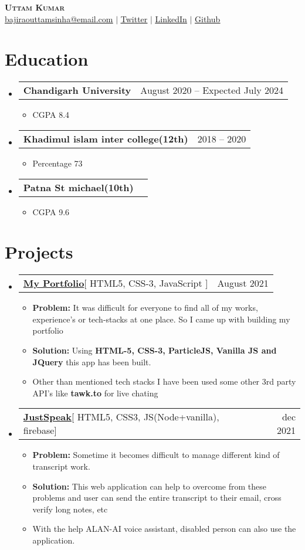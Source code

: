 \documentclass[letterpaper,11pt]{article}
\makeatletter
\newcommand{\resumeItem}[1]{
  \item\small{
    {#1 \vspace{-2pt}}
  }
}
\newcommand{\resumeProjectHeading}[2]{
    \item
    \begin{tabular*}{0.97\textwidth}{l@{\extracolsep{\fill}}r}
      \small#1 & #2 \\
    \end{tabular*}\vspace{-7pt}
}
\newcommand{\resumeSubHeadingListStart}{\begin{itemize}[leftmargin=0.15in, label={}]}
\newcommand{\resumeSubHeadingListEnd}{\end{itemize}}
\newcommand{\resumeItemListStart}{\begin{itemize}}
\newcommand{\resumeItemListEnd}{\end{itemize}\vspace{-5pt}}
\makeatother
\begin{document}

\begin{center}
    \textbf{\Huge \scshape Uttam Kumar} \\ \vspace{1pt}
    \href{mailto:youremailaddress}{\underline{bajiraouttamsinha@email.com}} $|$ 
    \href{https://twitter.com/Uttamku74410059}{\underline{Twitter}} $|$ 
    \href{https://linkedin.com/in/uttam-kumar-511a411ba}{\underline{LinkedIn}} $|$
    \href{https://github.com/helper-uttam}{\underline{Github}}
    
\end{center}

\section{Education}
  \resumeSubHeadingListStart
      \resumeProjectHeading
          {\textbf{Chandigarh University}}{August 2020 – Expected July 2024}
          \resumeItemListStart
           \resumeItem{CGPA 8.4}
        \resumeItemListEnd
        \resumeProjectHeading
          {\textbf{Khadimul islam inter college(12th)
}}{2018 -- 2020}
          \resumeItemListStart
           \resumeItem{Percentage 73}
        \resumeItemListEnd
        \resumeProjectHeading
          {\textbf{Patna St michael(10th)
}}{}
          \resumeItemListStart
           \resumeItem{CGPA 9.6}
        \resumeItemListEnd
    \resumeSubHeadingListEnd
    
\section{Projects}
    \resumeSubHeadingListStart
      \resumeProjectHeading
          {\textbf{\href{http://pubgofficial.me/portfolio/}{My Portfolio}}{[ HTML5, CSS-3, JavaScript ]}}{August 2021}
          \resumeItemListStart
           \resumeItem{\textbf{Problem:} It was difficult for everyone to find all of my works, experience's or tech-stacks at one place. So I came up with building my portfolio}
           \resumeItem{\textbf{Solution:} Using \textbf{HTML-5, CSS-3, ParticleJS, Vanilla JS and JQuery} this app has been built.}
           \resumeItem{Other than mentioned tech stacks I have been used some other 3rd party API's like \textbf{tawk.to} for live chating}
          \resumeItemListEnd
    \resumeSubHeadingListEnd
    
\resumeSubHeadingListStart
      \resumeProjectHeading
          {\textbf{\href{https://just-speak.herokuapp.com/}{JustSpeak}}{[ HTML5, CSS3, JS(Node+vanilla), firebase]}}{dec 2021}
          \resumeItemListStart
           \resumeItem{\textbf{Problem:} Sometime it becomes difficult to manage different kind of transcript work.}
           \resumeItem{\textbf{Solution:} This web application can help to overcome from these problems and user can send the entire transcript to their email, cross verify long notes, etc}
           \resumeItem{With the help ALAN-AI voice assistant, disabled person can also use the application.}
          \resumeItemListEnd
    \resumeSubHeadingListEnd
\end{document}
